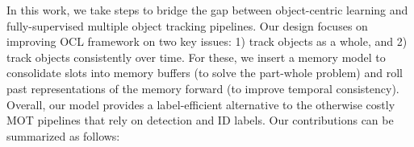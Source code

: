 
In this work, we take steps to bridge the gap between object-centric learning and fully-supervised multiple object tracking pipelines. Our design focuses on improving OCL framework on two key issues: 1) track objects as a whole, and 2) track objects consistently over time. For these, we insert a memory model to consolidate slots into memory buffers (to solve the part-whole problem) and roll past representations of the memory forward (to improve temporal consistency). 
Overall, our model provides a label-efficient alternative to the otherwise costly MOT pipelines that rely on detection and ID labels.
Our contributions can be summarized as follows:
